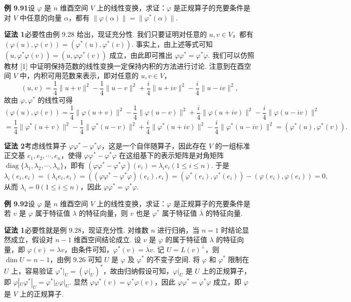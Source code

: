 \documentclass[UTF8,12pt,a4paper,fontset=fandol]{ctexart}
\begin{document}
\noindent\textbf{例 9.91}\quad 设 $\varphi$ 是 $n$ 维酉空间 $V$ 上的线性变换，求证：$\varphi$ 是正规算子的充要条件是对 $V$ 中任意的向量 $\alpha$，都有 $\|\varphi(\alpha)\|=\|\varphi^*(\alpha)\|$.

\noindent\textbf{证法 1}\quad 必要性由例 9.28 给出，现证充分性. 我们只要证明对任意的 $u,v\in V$，都有 $(\varphi(u),\varphi(v))=(\varphi^*(u),\varphi^*(v))$. 事实上，由上述等式可知 $(u,\varphi^*\varphi(v))=(u,\varphi\varphi^*(v))$ 成立，由此即可推出 $\varphi\varphi^*=\varphi^*\varphi$. 我们可以仿照教材 [1] 中证明保持范数的线性变换一定保持内积的方法进行讨论. 注意到在酉空间 $V$ 中，内积可用范数来表示，即对任意的 $u,v\in V$，
\[
(u,v)=\frac14\|u+v\|^2-\frac14\|u-v\|^2+\frac{i}{4}\|u+iv\|^2-\frac{i}{4}\|u-iv\|^2,
\]
故由 $\varphi,\varphi^*$ 的线性可得
\[
(\varphi(u),\varphi(v))
=\frac14\|\varphi(u+v)\|^2-\frac14\|\varphi(u-v)\|^2+\frac{i}{4}\|\varphi(u+iv)\|^2-\frac{i}{4}\|\varphi(u-iv)\|^2
\]
\[
=\frac14\|\varphi^*(u+v)\|^2-\frac14\|\varphi^*(u-v)\|^2+\frac{i}{4}\|\varphi^*(u+iv)\|^2-\frac{i}{4}\|\varphi^*(u-iv)\|^2
=(\varphi^*(u),\varphi^*(v)).
\]

\noindent\textbf{证法 2}\quad 考虑线性算子 $\varphi\varphi^*-\varphi^*\varphi$，这是一个自伴随算子，因此存在 $V$ 的一组标准正交基 $e_1,e_2,\cdots,e_n$，使得 $\varphi\varphi^*-\varphi^*\varphi$ 在这组基下的表示矩阵是对角矩阵 $\operatorname{diag}\{\lambda_1,\lambda_2,\cdots,\lambda_n\}$，即有 $(\varphi\varphi^*-\varphi^*\varphi)(e_i)=\lambda_ie_i(1\le i\le n)$. 于是
\[
\lambda_i(e_i,e_i)=(\lambda_ie_i,e_i)=((\varphi\varphi^*-\varphi^*\varphi)(e_i),e_i)=(\varphi^*(e_i),\varphi^*(e_i))-(\varphi(e_i),\varphi(e_i))=0,
\]
从而 $\lambda_i=0(1\le i\le n)$，因此 $\varphi\varphi^*=\varphi^*\varphi$.

\noindent\textbf{例 9.92}\quad 设 $\varphi$ 是 $n$ 维酉空间 $V$ 上的线性变换，求证：$\varphi$ 是正规算子的充要条件是若 $v$ 是 $\varphi$ 属于特征值 $\lambda$ 的特征向量，则 $v$ 也是 $\varphi^*$ 属于特征值 $\overline{\lambda}$ 的特征向量.

\noindent\textbf{证法 1}\quad 必要性就是例 9.28，现证充分性. 对维数 $n$ 进行归纳，当 $n=1$ 时结论显然成立，假设对 $n-1$ 维酉空间结论成立. 设 $v$ 是 $\varphi$ 的属于特征值 $\lambda$ 的特征向量，即 $\varphi(v)=\lambda v$，由条件可知，$\varphi^*(v)=\overline{\lambda}v$. 记 $U=L(v)^\perp$，则 $\dim U=n-1$，由例 9.26 可知 $U$ 是 $\varphi$ 及 $\varphi^*$ 的不变子空间. 将 $\varphi$ 和 $\varphi^*$ 限制在 $U$ 上，容易验证 $\varphi^*|_U=(\varphi|_U)^*$，故由归纳假设可知，$\varphi|_U$ 是 $U$ 上的正规算子，即 $\varphi|_U\varphi^*|_U=\varphi^*|_U\varphi|_U$. 显然 $\varphi\varphi^*(v)=\varphi^*\varphi(v)$，因此 $\varphi\varphi^*=\varphi^*\varphi$ 成立，即 $\varphi$ 是 $V$ 上的正规算子.
\end{document}
